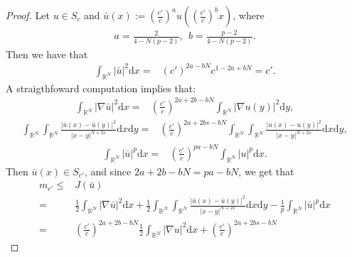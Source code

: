 \documentclass[12pt,a4paper,reqno]{amsart}
\numberwithin{equation}{section}
\begin{document}
\begin{proof}
Let $u\in S_{c}$ and $\bar{u}(x):=(\frac{c'}{c})^{a}u((\frac{c'}{c})^{b}x)$,
where
\begin{equation*}
\begin{aligned}
a=\frac{2}{4-N(p-2)},~~b=\frac{p-2}{4-N(p-2)}.
\end{aligned}
\end{equation*}
Then we have that
\begin{equation*}
\begin{aligned}
\int_{\mathbb{R}^{N}}
|\bar{u}|^{2}
\mathrm{d}x
=&(c')^{2a-bN}c^{1-2a+bN}=c'.
\end{aligned}
\end{equation*}
A straigthfoward computation implies that:
\begin{equation*}
\begin{aligned}
\int_{\mathbb{R}^{N}}
|\nabla \bar{u}|^{2}
\mathrm{d}x
=&(\frac{c'}{c})^{2a+2b-bN}
\int_{\mathbb{R}^{N}}
|\nabla u(y)|^{2}
\mathrm{d}y,
\end{aligned}
\end{equation*}
\begin{equation*}
\begin{aligned}
\int_{\mathbb{R}^{N}}
\int_{\mathbb{R}^{N}}
\frac{|\bar{u}(x)-\bar{u}(y)|^{2}}{|x-y|^{N+2s}}
\mathrm{d}x
\mathrm{d}y
=&(\frac{c'}{c})^{2a+2bs-bN}
\int_{\mathbb{R}^{N}}
\int_{\mathbb{R}^{N}}
\frac{|u(x)-u(y)|^{2}}{|x-y|^{N+2s}}
\mathrm{d}x
\mathrm{d}y,
\end{aligned}
\end{equation*}
\begin{equation*}
\begin{aligned}
\int_{\mathbb{R}^{N}}
|\bar{u}|^{p}
\mathrm{d}x
=&(\frac{c'}{c})^{pa-bN}
\int_{\mathbb{R}^{N}}
|u|^{p}
\mathrm{d}x.
\end{aligned}
\end{equation*}
Then $\bar{u}(x)\in S_{c'}$, and since $2a+2b-bN=pa-bN$,
we get that
\begin{equation*}
\begin{aligned}
m_{c'}
\leqslant& J(\bar{u})\\
=&\frac{1}{2}
\int_{\mathbb{R}^{N}}
|\nabla \bar{u}|^{2}
\mathrm{d}x
+\frac{1}{2}
\int_{\mathbb{R}^{N}}
\int_{\mathbb{R}^{N}}
\frac{|\bar{u}(x)-\bar{u}(y)|^{2}}{|x-y|^{N+2s}}
\mathrm{d}x
\mathrm{d}y
-\frac{1}{p}
\int_{\mathbb{R}^{N}}
|\bar{u}|^{p}
\mathrm{d}x\\
=&(\frac{c'}{c})^{2a+2b-bN}
\frac{1}{2}
\int_{\mathbb{R}^{N}}
|\nabla u|^{2}
\mathrm{d}x
+(\frac{c'}{c})^{2a+2bs-bN}

\end{aligned}
\end{equation*}
\end{proof}
\end{document}
